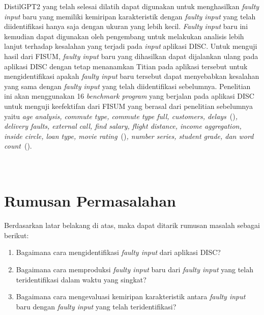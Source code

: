 DistilGPT2 yang telah selesai dilatih dapat digunakan
untuk menghasilkan \emph{faulty input} baru yang
memiliki kemiripan karakteristik dengan \emph{faulty input}
yang telah diidentifikasi hanya saja dengan ukuran
yang lebih kecil. \emph{Faulty input} baru ini kemudian dapat
digunakan oleh pengembang untuk melakukan analisis
lebih lanjut terhadap kesalahan yang terjadi pada \emph{input} aplikasi
DISC. Untuk menguji hasil dari FISUM, \emph{faulty input} 
baru yang dihasilkan dapat dijalankan ulang pada aplikasi DISC
dengan tetap menanamkan Titian pada aplikasi tersebut untuk
mengidentifikasi apakah \emph{faulty input} baru tersebut
dapat menyebabkan kesalahan yang sama dengan \emph{faulty input}
yang telah diidentifikasi sebelumnya. Penelitian ini
akan menggunakan 16 \emph{benchmark program} yang berjalan
pada aplikasi DISC untuk menguji keefektifan dari FISUM
yang berasal dari penelitian 
sebelumnya yaitu \emph{age analysis, commute type, commute type full,
customers, delays}~(\cite{gulzar2019})\emph{, delivery faults, external call,
find salary, flight distance, income aggregation,
inside circle, loan type, movie rating}~(\cite{humayun2023})\emph{, 
number series, student grade, dan
word count}~(\cite{zhang2021}).
\\
\\
\\


\section{Rumusan Permasalahan}
\label{sec:permasalahan}

Berdasarkan latar belakang di atas, maka dapat ditarik rumusan masalah sebagai berikut:

\begin{enumerate}[nolistsep]

   \item Bagaimana cara mengidentifikasi \emph{faulty input} dari aplikasi DISC?

   \item Bagaimana cara memproduksi \emph{faulty input} baru dari \emph{faulty input} yang telah teridentifikasi dalam waktu yang singkat?

   \item Bagaimana cara mengevaluasi kemiripan karakteristik antara \emph{faulty input} baru dengan \emph{faulty input} yang telah teridentifikasi?

\end{enumerate}

